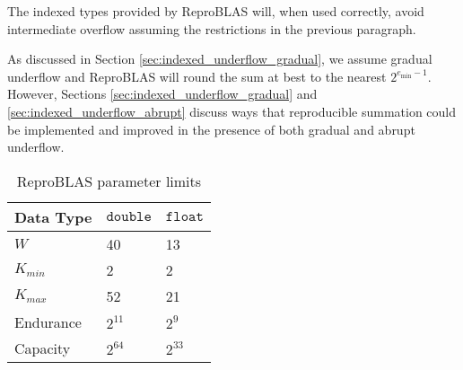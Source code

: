    The indexed types provided by ReproBLAS will, when used correctly, avoid intermediate overflow assuming the restrictions in the previous paragraph.

    As discussed in Section \ref{sec:indexed_underflow_gradual}, we assume gradual underflow and ReproBLAS will round the sum at best to the nearest $2^{e_{\min} - 1}$. However, Sections \ref{sec:indexed_underflow_gradual} and \ref{sec:indexed_underflow_abrupt} discuss ways that reproducible summation could be implemented and improved in the presence of both gradual and abrupt underflow.

    \begin{table}[!htbp]
        \centering
        \caption{ReproBLAS parameter limits}
        \begin{tabular}{| l | l | l |}\hline
            Data Type & $\texttt{double}$ & $\texttt{float}$ \\ \hline
            $W$ & 40 & 13 \\ \hline
            $K_{min}$ & 2 & 2 \\ \hline
            $K_{max}$ & 52 & 21 \\ \hline
            Endurance & $2^{11}$ & $2^9$ \\ \hline
            Capacity & $2^{64}$ & $2^{33}$ \\ \hline
        \end{tabular}
    \end{table}
